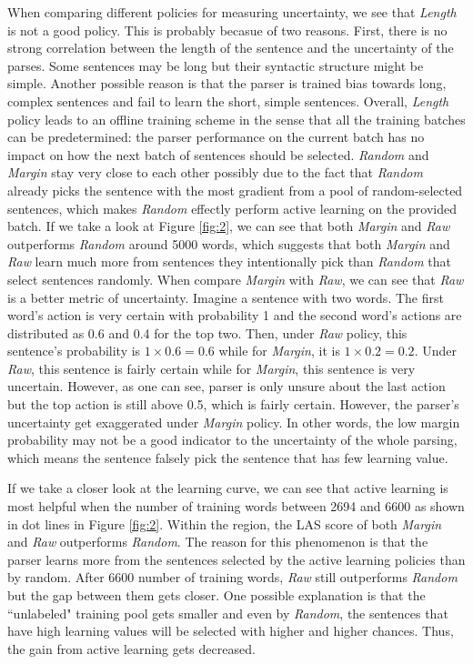 \documentclass[11pt,letterpaper]{article}
\begin{document}
When comparing different policies for measuring uncertainty, we see that \emph{Length} is not a good policy.
This is probably becasue of two reasons. First, there is no strong correlation between the length of
the sentence and the uncertainty of the parses. Some sentences may be long but their syntactic structure might be simple. Another
possible reason is that the parser is trained bias towards long, complex sentences and fail to learn the short, simple sentences.
Overall, \emph{Length} policy leads to an offline training scheme in the sense that all the training batches can be predetermined:
the parser performance on the current batch has no impact on how the next batch of sentences should be selected. \emph{Random} and
\emph{Margin} stay very close to each other possibly due to the fact that \emph{Random} already picks the sentence with the most
gradient from a pool of random-selected sentences, which makes \emph{Random} effectly perform active learning on the provided batch.
If we take a look at Figure \ref{fig:2}, we can see that both \emph{Margin} and \emph{Raw} outperforms \emph{Random} around 5000 words,
which suggests that both \emph{Margin} and \emph{Raw} learn much more from sentences they intentionally pick than \emph{Random} that
select sentences randomly. When compare \emph{Margin} with \emph{Raw}, we can see that \emph{Raw} is a better metric of uncertainty.
Imagine a sentence with two words. The first word's action is very certain with probability 1 and the second word's actions are distributed
as 0.6 and 0.4 for the top two. Then, under \emph{Raw} policy, this sentence's probability is $1 \times 0.6 = 0.6$ while for \emph{Margin},
it is $1 \times 0.2 = 0.2$. Under \emph{Raw}, this sentence is fairly certain while for \emph{Margin}, this sentence is very uncertain. However,
as one can see, parser is only unsure about the last action but the top action is still above 0.5, which is fairly certain. However, the
parser's uncertainty get exaggerated under \emph{Margin} policy. In other words, the low margin probability may not be a good indicator
to the uncertainty of the whole parsing, which means the sentence falsely pick the sentence that has few learning value.

If we take a closer look at the learning curve, we can see that active learning is most helpful when the number of training words between
2694 and 6600 as shown in dot lines in Figure \ref{fig:2}. Within the region, the LAS score of both \emph{Margin} and \emph{Raw} outperforms
\emph{Random}. The reason for this phenomenon is that the parser learns more from the sentences selected by the active learning policies than
by random. After 6600 number of training words, \emph{Raw} still outperforms \emph{Random} but the gap between them gets closer. One possible
explanation is that the ``unlabeled" training pool gets smaller and even by \emph{Random}, the sentences that have high learning values will
be selected with higher and higher chances. Thus, the gain from active learning gets decreased.
\end{document}
